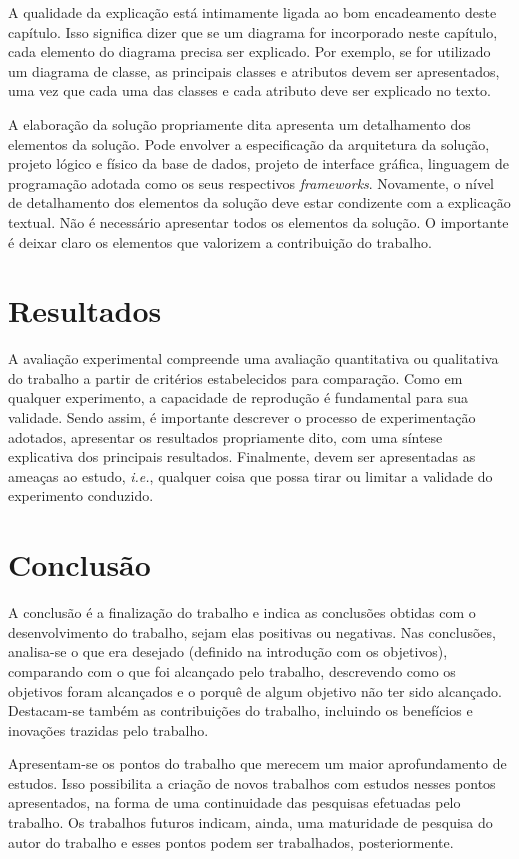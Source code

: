 \documentclass[12pt]{tcc}
\begin{document}
A qualidade da explicação está intimamente ligada ao bom encadeamento deste capítulo. Isso significa dizer que se um diagrama for incorporado neste capítulo, cada elemento do diagrama precisa ser explicado. Por exemplo, se for utilizado um diagrama de classe, as principais classes e atributos devem ser apresentados, uma vez que cada uma das classes e cada atributo deve ser explicado no texto.

A elaboração da solução propriamente dita apresenta um detalhamento dos elementos da solução. Pode envolver a especificação da arquitetura da solução, projeto lógico e físico da base de dados, projeto de interface gráfica, linguagem de programação adotada como os seus respectivos \emph{frameworks}. Novamente, o nível de detalhamento dos elementos da solução deve estar condizente com a explicação textual. Não é necessário apresentar todos os elementos da solução. O importante é deixar claro os elementos que valorizem a contribuição do trabalho.

\chapter{Resultados}
\label{sec:aval_exp}

A avaliação experimental compreende uma avaliação quantitativa ou qualitativa do trabalho a partir de critérios estabelecidos para comparação. Como em qualquer experimento, a capacidade de reprodução é fundamental para sua validade. Sendo assim, é importante descrever o processo de experimentação adotados, apresentar os resultados propriamente dito, com uma síntese explicativa dos principais resultados. Finalmente, devem ser apresentadas as ameaças ao estudo, \emph{i.e.}, qualquer coisa que possa tirar ou limitar a validade do experimento conduzido. 

\chapter{Conclusão}
	\label{sec:conclusao}

	A conclusão é a finalização do trabalho e indica as conclusões obtidas com o desenvolvimento do trabalho, sejam elas positivas ou negativas. Nas conclusões, analisa-se o que era desejado (definido na introdução com os objetivos), comparando com o que foi alcançado pelo trabalho, descrevendo como os objetivos foram alcançados e o porquê de algum objetivo não ter sido alcançado. Destacam-se também as contribuições do trabalho, incluindo os benefícios e inovações trazidas pelo trabalho.

Apresentam-se os pontos do trabalho que merecem um maior aprofundamento de estudos. Isso possibilita a criação de novos trabalhos com estudos nesses pontos apresentados, na forma de uma continuidade das pesquisas efetuadas pelo trabalho. Os trabalhos futuros indicam, ainda, uma maturidade de pesquisa do autor do trabalho e esses pontos podem ser trabalhados, posteriormente.

\label{bibpage}
\renewcommand\bibname{Referências}

%

\label{bibfinalpage}

\label{lastpage}
\end{document}
